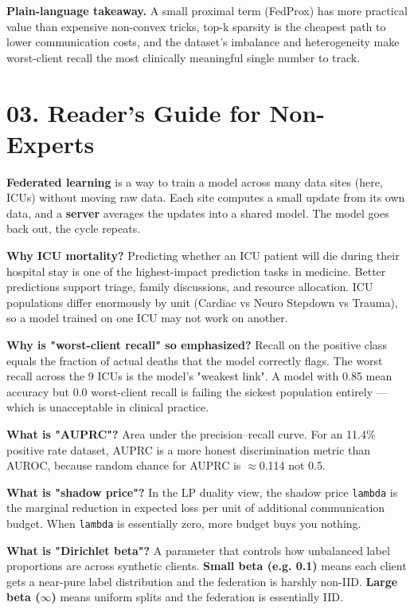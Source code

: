\documentclass{article}
\begin{document}
\textbf{Plain-language takeaway.} A small proximal term (FedProx) has more practical value than expensive non-convex tricks, top-k sparsity is the cheapest path to lower communication costs, and the dataset's imbalance and heterogeneity make worst-client recall the most clinically meaningful single number to track.



\clearpage
\section{03. Reader's Guide for Non-Experts}


\textbf{Federated learning} is a way to train a model across many data sites (here, ICUs) without moving raw data. Each site computes a small update from its own data, and a \textbf{server} averages the updates into a shared model. The model goes back out, the cycle repeats.


\textbf{Why ICU mortality?} Predicting whether an ICU patient will die during their hospital stay is one of the highest-impact prediction tasks in medicine. Better predictions support triage, family discussions, and resource allocation. ICU populations differ enormously by unit (Cardiac vs Neuro Stepdown vs Trauma), so a model trained on one ICU may not work on another.


\textbf{Why is "worst-client recall" so emphasized?} Recall on the positive class equals the fraction of actual deaths that the model correctly flags. The worst recall across the 9 ICUs is the model's "weakest link". A model with 0.85 mean accuracy but 0.0 worst-client recall is failing the sickest population entirely --- which is unacceptable in clinical practice.


\textbf{What is "AUPRC"?} Area under the precision--recall curve. For an 11.4\% positive rate dataset, AUPRC is a more honest discrimination metric than AUROC, because random chance for AUPRC is \ensuremath{\approx}0.114 not 0.5.


\textbf{What is "shadow price"?} In the LP duality view, the shadow price \texttt{lambda} is the marginal reduction in expected loss per unit of additional communication budget. When \texttt{lambda} is essentially zero, more budget buys you nothing.


\textbf{What is "Dirichlet beta"?} A parameter that controls how unbalanced label proportions are across synthetic clients. \textbf{Small beta (e.g. 0.1)} means each client gets a near-pure label distribution and the federation is harshly non-IID. \textbf{Large beta (\ensuremath{\infty})} means uniform splits and the federation is essentially IID.
\end{document}

